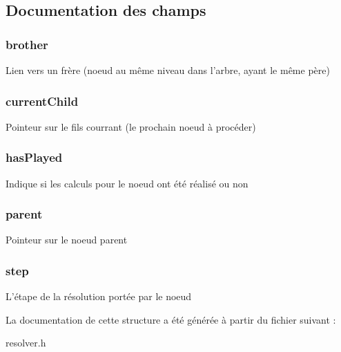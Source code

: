 \subsection{Documentation des champs}
\hypertarget{struct_node_tree_a5ef305fb016dbd90107261284be7f64d}{
\subsubsection[{brother}]{\setlength{\rightskip}{0pt plus 5cm}brother}}\label{struct_node_tree_a5ef305fb016dbd90107261284be7f64d}
Lien vers un frère (noeud au même niveau dans l'arbre, ayant le même père) \hypertarget{struct_node_tree_a171a4a950363163c8a809722b874ace5}{
\subsubsection[{current\-Child}]{\setlength{\rightskip}{0pt plus 5cm}current\-Child}}\label{struct_node_tree_a171a4a950363163c8a809722b874ace5}
Pointeur sur le fils courrant (le prochain noeud à procéder) \hypertarget{struct_node_tree_aeb3531905942c7123621cd828297f99a}{
\subsubsection[{has\-Played}]{\setlength{\rightskip}{0pt plus 5cm}has\-Played}}\label{struct_node_tree_aeb3531905942c7123621cd828297f99a}
Indique si les calculs pour le noeud ont été réalisé ou non \hypertarget{struct_node_tree_a457d913bff1ebc8671c1eca1c9d5fc03}{
\subsubsection[{parent}]{\setlength{\rightskip}{0pt plus 5cm}parent}}\label{struct_node_tree_a457d913bff1ebc8671c1eca1c9d5fc03}
Pointeur sur le noeud parent \hypertarget{struct_node_tree_ae5f3bfeb7e3cb5c8bc769d5504ebeeae}{
\subsubsection[{step}]{\setlength{\rightskip}{0pt plus 5cm}step}}\label{struct_node_tree_ae5f3bfeb7e3cb5c8bc769d5504ebeeae}
L'étape de la résolution portée par le noeud 

La documentation de cette structure a été générée à partir du fichier suivant \-:\begin{DoxyCompactItemize}
\item 
resolver.\-h\end{DoxyCompactItemize}
